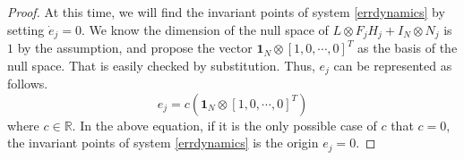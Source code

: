 \documentclass[11pt, a4paper, oneside, openany, reqno]{book}
\theoremstyle{definition}
\theoremstyle{remark}
\numberwithin{equation}{chapter} %
\newcommand{\R}{\ensuremath{{\mathbb R}}}
\newcommand{\ONE}{\textbf{1}}
\begin{document}
\begin{proof}
	At this time, we will find the invariant points of system \eqref{errdynamics}
	by setting $ \dot{e}_j = 0 $.
	We know the dimension of the null space of $ L \otimes F_j H_j  + I_N \otimes N_j  $
	is $ 1 $ by the assumption,	
	and propose the vector 
	$ \ONE_N \otimes \left[ 1, 0, \cdots ,0 \right]^T $
	as the basis of the null space. That is easily checked by substitution.
	Thus, $ e_j $ can be represented as follows.	
	\begin{equation}\label{invariant}
	e_j=c (\ONE_N \otimes \left[ 1, 0, \cdots ,0 \right]^T)
	\end{equation}
	where $ c \in \R $. In the above equation, 
	if it is the only possible case of $ c $  that $ c= 0 $, 
	the invariant points of system \eqref{errdynamics} is the origin $ e_j = 0 $.
	

\end{proof}
\end{document}
